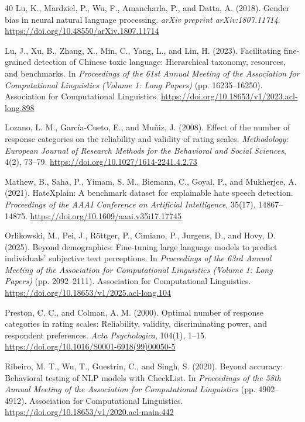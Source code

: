 \documentclass[a4paper,fleqn,review]{cas-sc}
\begin{document}
\begin{thebibliography}{40}
Lu, K., Mardziel, P., Wu, F., Amancharla, P., and Datta, A. (2018).
Gender bias in neural natural language processing.
\emph{arXiv preprint arXiv:1807.11714}.
\url{https://doi.org/10.48550/arXiv.1807.11714}

Lu, J., Xu, B., Zhang, X., Min, C., Yang, L., and Lin, H. (2023).
Facilitating fine-grained detection of Chinese toxic language: Hierarchical taxonomy, resources, and benchmarks.
In \emph{Proceedings of the 61st Annual Meeting of the Association for Computational Linguistics (Volume 1: Long Papers)} (pp. 16235--16250).
Association for Computational Linguistics.
\url{https://doi.org/10.18653/v1/2023.acl-long.898}

Lozano, L. M., Garc\'ia-Cueto, E., and Mu\~niz, J. (2008).
Effect of the number of response categories on the reliability and validity of rating scales.
\emph{Methodology: European Journal of Research Methods for the Behavioral and Social Sciences}, 4(2), 73--79.
\url{https://doi.org/10.1027/1614-2241.4.2.73}

Mathew, B., Saha, P., Yimam, S. M., Biemann, C., Goyal, P., and Mukherjee, A. (2021).
HateXplain: A benchmark dataset for explainable hate speech detection.
\emph{Proceedings of the AAAI Conference on Artificial Intelligence}, 35(17), 14867--14875.
\url{https://doi.org/10.1609/aaai.v35i17.17745}

Orlikowski, M., Pei, J., R\"ottger, P., Cimiano, P., Jurgens, D., and Hovy, D. (2025).
Beyond demographics: Fine-tuning large language models to predict individuals' subjective text perceptions.
In \emph{Proceedings of the 63rd Annual Meeting of the Association for Computational Linguistics (Volume 1: Long Papers)} (pp. 2092--2111).
Association for Computational Linguistics.
\url{https://doi.org/10.18653/v1/2025.acl-long.104}

Preston, C. C., and Colman, A. M. (2000).
Optimal number of response categories in rating scales: Reliability, validity, discriminating power, and respondent preferences.
\emph{Acta Psychologica}, 104(1), 1--15.
\url{https://doi.org/10.1016/S0001-6918(99)00050-5}

Ribeiro, M. T., Wu, T., Guestrin, C., and Singh, S. (2020).
Beyond accuracy: Behavioral testing of NLP models with CheckList.
In \emph{Proceedings of the 58th Annual Meeting of the Association for Computational Linguistics} (pp. 4902--4912).
Association for Computational Linguistics.
\url{https://doi.org/10.18653/v1/2020.acl-main.442}


\end{thebibliography}
\end{document}
